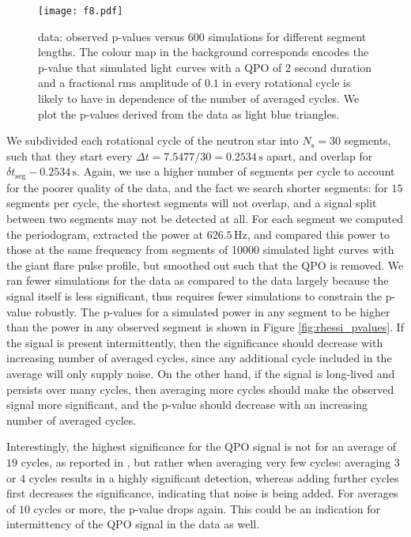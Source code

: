 \documentclass{emulateapj}
\begin{document}
\begin{figure}[htbp]
\begin{center}
\texttt{[image: f8.pdf]}
\caption{\rhessi data: observed p-values versus $600$ simulations for different segment lengths. The colour map in the background corresponds encodes the p-value that simulated light curves with a QPO of $2$ second duration and a fractional rms amplitude of $0.1$ in every rotational cycle is likely to have in dependence of the number of averaged cycles. We plot the p-values derived from the \rhessi data as light blue triangles.}

\label{fig:rhessi_sims1_pvalues}
\end{center}
\end{figure}
We subdivided each rotational cycle of the neutron star into $N_\mathrm{s} = 30$ segments, such that they start every $\Delta t = 7.5477/30 = 0.2534 \, \mathrm{s}$ apart, and overlap for $\delta t_\mathrm{seg} - 0.2534 \, \mathrm{s}$. Again, we use a higher number of segments per cycle to account for the poorer quality of the \rhessi data, and the fact we search shorter segments: for $15$ segments per cycle, the shortest segments will not overlap, and a signal split between two segments may not be detected at all.
For each segment we computed the periodogram, extracted the power at $626.5 \, \mathrm{Hz}$, and compared this power to those at the same frequency from segments of 10000 simulated light curves with the giant flare pulse profile, but smoothed out such that the QPO is removed. We ran fewer simulations for the \rhessi data as compared to the \rxte data largely because the signal itself is less significant, thus requires fewer simulations to constrain the p-value robustly. 
The p-values for a simulated power in any segment to be higher than the power in any observed segment is shown in Figure \ref{fig:rhessi_pvalues}. If the signal is present intermittently, then the significance should decrease with increasing number of averaged cycles, since any additional cycle included in the average will only supply noise. On the other hand, if the signal is long-lived and persists over many cycles, then averaging more cycles should make the observed signal more significant, and the p-value should decrease with an increasing number of averaged cycles.

Interestingly, the highest significance for the QPO signal is not for an average of $19$ cycles, as reported in \citet{Watts06}, but rather when averaging very few cycles: averaging $3$ or $4$ cycles results in a highly significant detection, whereas adding further cycles first decreases the significance, indicating that noise is being added. For averages of $10$ cycles or more, the p-value drops again. This could be an indication for intermittency of the QPO signal in the \rhessi data as well.
\end{document}
